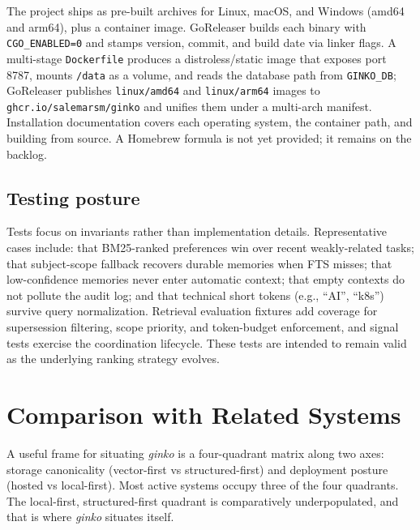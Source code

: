 \documentclass[11pt,a4paper]{article}
\begin{document}
The project ships as pre-built archives for Linux, macOS, and Windows (amd64 and arm64), plus a container image. GoReleaser builds each binary with \texttt{CGO\_ENABLED=0} and stamps version, commit, and build date via linker flags. A multi-stage \texttt{Dockerfile} produces a distroless/static image that exposes port 8787, mounts \texttt{/data} as a volume, and reads the database path from \texttt{GINKO\_DB}; GoReleaser publishes \texttt{linux/amd64} and \texttt{linux/arm64} images to \texttt{ghcr.io/salemarsm/ginko} and unifies them under a multi-arch manifest. Installation documentation covers each operating system, the container path, and building from source. A Homebrew formula is not yet provided; it remains on the backlog.

\subsection{Testing posture}

Tests focus on invariants rather than implementation details. Representative cases include: that BM25-ranked preferences win over recent weakly-related tasks; that subject-scope fallback recovers durable memories when FTS misses; that low-confidence memories never enter automatic context; that empty contexts do not pollute the audit log; and that technical short tokens (e.g., ``AI'', ``k8s'') survive query normalization. Retrieval evaluation fixtures add coverage for supersession filtering, scope priority, and token-budget enforcement, and signal tests exercise the coordination lifecycle. These tests are intended to remain valid as the underlying ranking strategy evolves.

\section{Comparison with Related Systems}

A useful frame for situating \textit{ginko} is a four-quadrant matrix along two axes: storage canonicality (vector-first vs structured-first) and deployment posture (hosted vs local-first). Most active systems occupy three of the four quadrants. The local-first, structured-first quadrant is comparatively underpopulated, and that is where \textit{ginko} situates itself.
\end{document}
